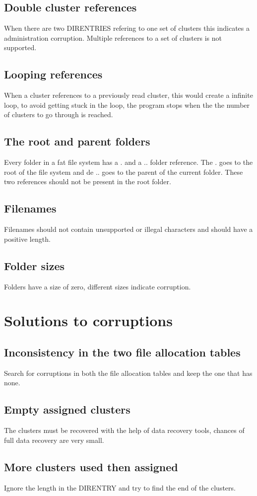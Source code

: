\documentclass[pdftex,12pt,a4paper]{article}
\begin{document}
\subsection{Double cluster references}
When there are two DIRENTRIES refering to one set of clusters this indicates a administration corruption. Multiple references to a set of clusters is not supported.
\subsection{Looping references}
When a cluster references to a previously read cluster, this would create a infinite loop, to avoid getting stuck in the loop, the program stops when the the number of clusters to go through is reached.
\subsection{The root and parent folders}
Every folder in a fat file system has a . and a .. folder reference. The . goes to the root of the file system and de .. goes to the parent of the current folder. These two references should not be present in the root folder.
\subsection{Filenames}
Filenames should not contain unsupported or illegal characters and should have a positive length.
\subsection{Folder sizes}
Folders have a size of zero, different sizes indicate corruption.
\section{Solutions to corruptions}
\subsection{Inconsistency in the two file allocation tables}
Search for corruptions in both the file allocation tables and keep the one that has none.
\subsection{Empty assigned clusters}
The clusters must be recovered with the help of data recovery tools, chances of full data recovery are very small.
\subsection{More clusters used then assigned}
Ignore the length in the DIRENTRY and try to find the end of the clusters.
\end{document}
